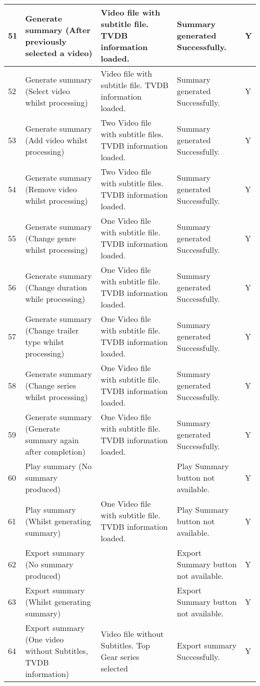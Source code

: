 \begin{center}
\begin{longtable}{| p{18pt} | p{100pt}| p{100pt}| p{110pt} | p{46pt} |}
\\\hline
51	&Generate summary (After previously selected a video)					&Video file with subtitle file. TVDB information loaded.	&Summary generated Successfully.	&Y
\\\hline	
52	&Generate summary (Select video whilst processing)					&Video file with subtitle file. TVDB information loaded.	&Summary generated Successfully.	&Y	
\\\hline	
53	&Generate summary (Add video whilst processing)						&Two Video file with subtitle files. TVDB information loaded. 	&Summary generated Successfully.&Y	
\\\hline	
54	&Generate summary (Remove video whilst processing)					&Two Video file with subtitle files. TVDB information loaded. 	&Summary generated Successfully.&Y	
\\\hline	
55	&Generate summary (Change genre whilst processing)					&One Video file with subtitle file. TVDB information loaded. 	&Summary generated Successfully.&Y	
\\\hline	
56	&Generate summary (Change duration while processing)					&One Video file with subtitle file. TVDB information loaded. 	&Summary generated Successfully.&Y
\\\hline	
57	&Generate summary (Change trailer type whilst processing)				&One Video file with subtitle file. TVDB information loaded. 	&Summary generated Successfully.&Y	
\\\hline	
58	&Generate summary (Change series whilst processing)					&One Video file with subtitle file. TVDB information loaded. 	&Summary generated Successfully.&Y
\\\hline	
59	&Generate summary (Generate summary again after completion)			&One Video file with subtitle file. TVDB information loaded. 	&Summary generated Successfully.&Y
\\\hline					
60	&Play summary (No summary produced)								&											&Play Summary button not available.&Y		
\\\hline
61	&Play summary (Whilst generating summary)							&One Video file with subtitle file. TVDB information loaded. 	&Play Summary button not available.&Y	
\\\hline
62	&Export summary (No summary produced)							&											&Export Summary button not available.	&Y		
\\\hline
63	&Export summary (Whilst generating summary)						&											&Export Summary button not available.	&Y		
\\\hline		
64	&Export summary (One video without Subtitles, TVDB information)			&Video file without Subtitles. Top Gear series selected		&Export summary Successfully.	&Y	

\end{longtable}
\end{center}
